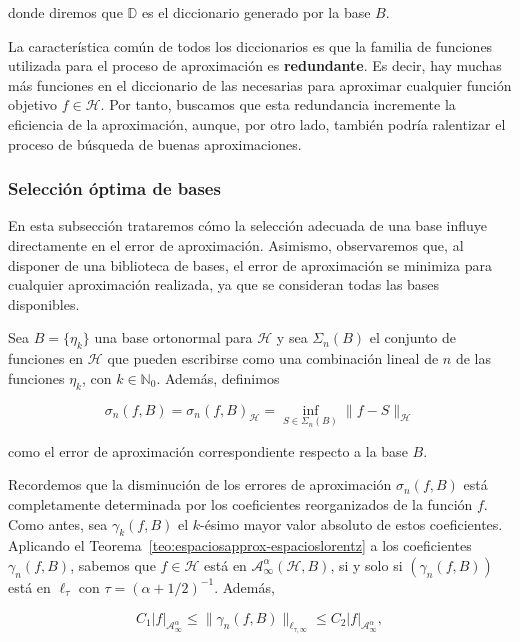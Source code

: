 donde diremos que $\mathbb{D}$ es el diccionario generado por la base $B$.\newline

La característica común de todos los diccionarios es que la familia de funciones utilizada para el proceso de aproximación es \textbf{redundante}. Es decir, hay muchas más funciones en el diccionario de las necesarias para aproximar cualquier función objetivo $f \in \mathcal{H}$. Por tanto, buscamos que esta redundancia incremente la eficiencia de la aproximación, aunque, por otro lado, también podría ralentizar el proceso de búsqueda de buenas aproximaciones.\newline

\subsubsection{Selección óptima de bases}\label{subsubsec:seleccion-optima-bases}

En esta subsección trataremos cómo la selección adecuada de una base influye directamente en el error de aproximación. Asimismo, observaremos que, al disponer de una biblioteca de bases, el error de aproximación se minimiza para cualquier aproximación realizada, ya que se consideran todas las bases disponibles.\newline

Sea $B = \{ \eta_k \}$ una base ortonormal para $\mathcal{H}$ y sea $\Sigma_n(B)$ el conjunto de funciones en $\mathcal{H}$ que pueden escribirse como una combinación lineal de $n$ de las funciones $\eta_k$, con $k \in \mathbb{N}_0$. Además, definimos

\[
    \sigma_n(f, B) = \sigma_n(f,B)_{\mathcal{H}} = \inf_{S \in \Sigma_n(B)} \| f - S \|_{\mathcal{H}}
\]

como el error de aproximación correspondiente respecto a la base $B$.\newline

Recordemos que la disminución de los errores de aproximación $\sigma_n(f, B)$ está completamente determinada por los coeficientes reorganizados de la función $f$. Como antes, sea $\gamma_k(f, B)$ el $k$-ésimo mayor valor absoluto de estos coeficientes. Aplicando el Teorema~\ref{teo:espaciosapprox-espacioslorentz} a los coeficientes $\gamma_n(f, B)$, sabemos que $f \in \mathcal{H}$ está en $\mathcal{A}_\infty^\alpha (\mathcal{H}, B)$, si y solo si $(\gamma_n(f, B))$ está en $\ell_{\tau}$ con $\tau = (\alpha + 1/2)^{-1}$. Además, 

\begin{equation}\label{eq:bases}
    C_1 |f|_{\mathcal{A}_\infty^\alpha} \leq \| \gamma_n(f, B) \|_{\ell_{\tau, \infty}} \leq C_2 |f|_{\mathcal{A}_\infty^\alpha},
\end{equation}


